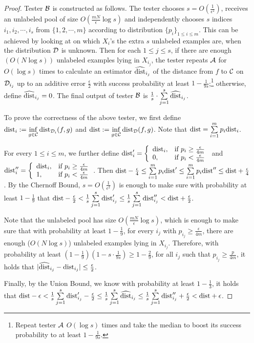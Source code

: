 \begin{proof}
Tester ${\mathcal B}$ is constructed as follows. The tester chooses $s=O(\frac{1}{\epsilon^2})$, receives an unlabeled pool of size $O(\frac{mN}{\epsilon}\log s)$ and independently chooses $s$ indices $i_1,i_2,\cdots,i_s$ from $\{1,2,\cdots,m\}$ according to distribution $\{p_i\}_{1\leq i\leq m}$. This can be achieved by looking at on which $X_i$'s the extra $s$ unlabeled examples are, when the distribution ${\mathcal{D}}$ is unknown. Then for each $1\leq j\leq s$, if there are enough $(O(N\log s))$ unlabeled examples lying in $X_{i_j}$, the tester repeats ${\mathcal{A}}$ for $O(\log s)$ times to calculate an estimator $\widehat{{\mathrm{dist}}}_{i_j}$ of the distance from $f$ to ${\mathcal{C}}$ on ${\mathcal{D}}_{i_j}$ up to an additive error $\frac{\epsilon}{2}$ with success probability at least $1-\frac{1}{9s}$;\footnote{Repeat tester ${\mathcal{A}}$ $O(\log s)$ times and take the median to boost its success probability to at least $1-\frac{1}{9s}$.} otherwise, define $\widehat{{\mathrm{dist}}}_{i_j}=0$. The final output of tester ${\mathcal B}$ is $\frac{1}{s}\cdot\sum\limits_{j=1}^s\widehat{{\mathrm{dist}}}_{i_j}$.

To prove the correctness of the above tester, we first define ${\mathrm{dist}}_i:=\inf\limits_{g\in{\mathcal{C}}}{\mathrm{dist}}_{{\mathcal{D}}_i}(f,g)$ and ${\mathrm{dist}}:=\inf\limits_{g\in{\mathcal{C}}}{\mathrm{dist}}_{{\mathcal{D}}}(f,g)$. Note that ${\mathrm{dist}}=\sum\limits_{i=1}^mp_i{\mathrm{dist}}_{i}$. 

For every $1\leq i\leq m$, we further define ${\mathrm{dist}}_i'=\left\{\begin{array}{ll}{\mathrm{dist}}_i,&\text{if $p_i\geq\frac{\epsilon}{4m}$}\\0,&\text{if $p_i<\frac{\epsilon}{4m}$}\end{array}\right.$ and ${\mathrm{dist}}_i''=\left\{\begin{array}{ll}{\mathrm{dist}}_i,&\text{if $p_i\geq\frac{\epsilon}{4m}$}\\1,&\text{if $p_i<\frac{\epsilon}{4m}$}\end{array}\right.$. Then ${\mathrm{dist}}-\frac{\epsilon}{4}\leq \sum\limits_{i=1}^mp_i{\mathrm{dist}}'\leq\sum\limits_{i=1}^mp_i{\mathrm{dist}}''\leq{\mathrm{dist}}+\frac{\epsilon}{4}$. By the Chernoff Bound, $s=O(\frac{1}{\epsilon^2})$ is enough to make sure with probability at least $1-\frac{1}{9}$ that ${\mathrm{dist}}-\frac{\epsilon}{2}<\frac{1}{s}\sum\limits_{j=1}^s{\mathrm{dist}}'_{i_j}\leq\frac{1}{s}\sum\limits_{j=1}^s{\mathrm{dist}}''_{i_j}<{\mathrm{dist}}+\frac{\epsilon}{2}$.

Note that the unlabeled pool has size $O(\frac{mN}{\epsilon}\log s)$, which is enough to make sure that with probability at least $1-\frac{1}{9}$, for every $i_j$ with $p_{i_j}\geq\frac{\epsilon}{4m}$, there are enough ($O(N\log s)$) unlabeled examples lying in $X_{i_j}$. Therefore, with probability at least $(1-\frac{1}{9})(1-s\cdot\frac{1}{9s})\geq 1-\frac{2}{9}$, for all $i_j$ such that $p_{i_j}\geq \frac{p}{4m}$, it holds that $|\widehat {{\mathrm{dist}}}_{i_j}-{\mathrm{dist}}_{i_j}|\leq\frac{\epsilon}{2}$.

Finally, by the Union Bound, we know with probability at least $1-\frac{1}{3}$, it holds that ${\mathrm{dist}}-\epsilon<\frac{1}{s}\sum\limits_{j=1}^s{\mathrm{dist}}'_{i_j}-\frac{\epsilon}{2}\leq \frac{1}{s}\sum\limits_{j=1}^s\widehat{{\mathrm{dist}}}_{i_j}\leq\frac{1}{s}\sum\limits_{j=1}^s{\mathrm{dist}}''_{i_j}+\frac{\epsilon}{2}<{\mathrm{dist}}+\epsilon$.
\end{proof}
